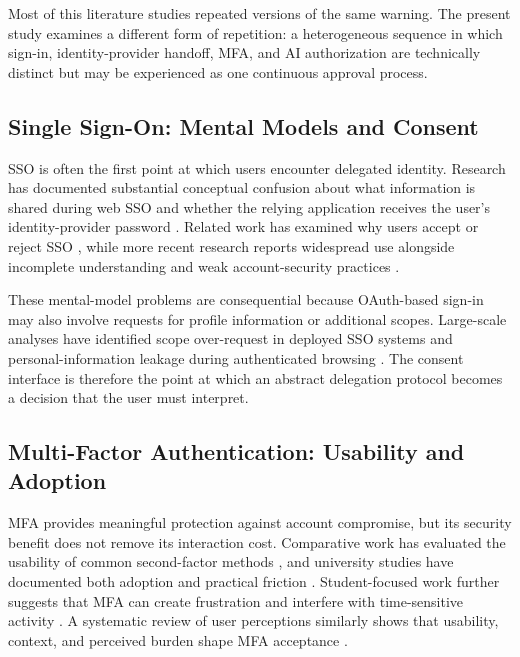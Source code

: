 \documentclass[11pt]{article}
\begin{document}
Most of this literature studies repeated versions of the same warning. The
present study examines a different form of repetition: a heterogeneous
sequence in which sign-in, identity-provider handoff, MFA, and AI
authorization are technically distinct but may be experienced as one
continuous approval process.

\subsection{Single Sign-On: Mental Models and Consent}
\label{sec:rw-sso}

SSO is often the first point at which users encounter delegated identity.
Research has documented substantial conceptual confusion about what
information is shared during web SSO and whether the relying application
receives the user's identity-provider password
\cite{sun2013investigating}. Related work has examined why users accept or
reject SSO \cite{sun2011makes}, while more recent research reports widespread
use alongside incomplete understanding and weak account-security practices
\cite{petrie2024passwords}.

These mental-model problems are consequential because OAuth-based sign-in may
also involve requests for profile information or additional scopes. Large-scale
analyses have identified scope over-request in deployed SSO systems
\cite{dimova2023ssomething} and personal-information leakage during
authenticated browsing \cite{pham2025consented}. The consent interface is
therefore the point at which an abstract delegation protocol becomes a
decision that the user must interpret.

\subsection{Multi-Factor Authentication: Usability and Adoption}
\label{sec:rw-mfa}

MFA provides meaningful protection against account compromise, but its
security benefit does not remove its interaction cost. Comparative work has
evaluated the usability of common second-factor methods
\cite{reese2019usability}, and university studies have documented both
adoption and practical friction \cite{colnago2018horrible}. Student-focused
work further suggests that MFA can create frustration and interfere with
time-sensitive activity \cite{arnold2022emotional}. A systematic review of
user perceptions similarly shows that usability, context, and perceived burden
shape MFA acceptance \cite{das2019evaluating}.
\end{document}
